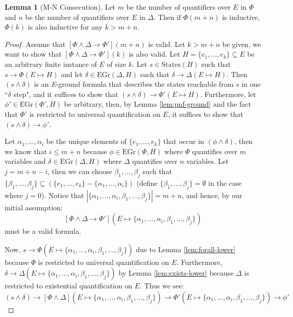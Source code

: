 \documentclass[12pt]{article}
\theoremstyle{definition}
\newtheorem{lemma}{Lemma}
\theoremstyle{remark}
\newcommand{\states}{\text{States}}
\newcommand{\gr}{\text{EGr}}
\begin{document}
\begin{lemma}[M-N Consecution]
  \label{ref:consecution}
  Let $m$ be the number of quantifiers over $E$ in $\Phi$ and $n$ be the number of quantifiers over $E$ in $\Delta$.  Then if $\Phi(m+n)$ is inductive, $\Phi(k)$ is also inductive for any $k>m+n$.
\end{lemma}
\begin{proof}
  Assume that $[\Phi\land\Delta \rightarrow \Phi'](m+n)$ is valid.  Let $k>m+n$ be given, we want to show that $[\Phi\land\Delta \rightarrow \Phi'](k)$ is also valid.  Let $H = \{e_1,...,e_k\} \subseteq E$ be an arbitrary finite instance of $E$ of size $k$.  Let $s \in \states(H)$ such that $s \rightarrow \Phi(E \mapsto H)$ and let $\delta \in \gr(\Delta,H)$ such that $\delta \rightarrow \Delta(E \mapsto H)$.  Then $(s \land \delta)$ is an \textit{E}-ground formula that describes the states reachable from $s$ in one ``$\delta$ step", and it suffices to show that $(s \land \delta) \rightarrow \Phi'(E \mapsto H)$.  Furthermore, let $\phi' \in \gr(\Phi',H)$ be arbitrary, then, by Lemma \ref{lem:pnf-ground} and the fact that $\Phi'$ is restricted to universal quantification on $E$, it suffices to show that $(s \land \delta) \rightarrow \phi'$.

  Let $\alpha_1,...,\alpha_i$ be the unique elements of $\{e_1,...,e_k\}$ that occur in $(\phi \land \delta)$, then we know that $i \leq m+n$ because $\phi \in \gr(\Phi,H)$ where $\Phi$ quantifies over $m$ variables and $\delta \in \gr(\Delta,H)$ where $\Delta$ quantifies over $n$ variables.  Let $j = m+n-i$, then we can choose $\beta_1,...,\beta_j$ such that $\{\beta_1,...,\beta_j\} \subseteq (\{e_1,...,e_k\}-\{\alpha_1,...,\alpha_i\})$ (define $\{\beta_1,...,\beta_j\}=\emptyset$ in the case where $j=0$).  Notice that $|\{\alpha_1,...,\alpha_i,\beta_1,...,\beta_j\}|=m+n$, and hence, by our initial assumption:
  $$[\Phi\land\Delta \rightarrow \Phi'](E \mapsto \{\alpha_1,...,\alpha_i,\beta_1,...,\beta_j\})$$
  must be a valid formula.

  Now, $s \rightarrow \Phi(E \mapsto \{\alpha_1,...,\alpha_i,\beta_1,...,\beta_j\})$ due to Lemma \ref{lem:forall-lower} because $\Phi$ is restricted to universal quantification on $E$.  Furthermore, $\delta \rightarrow \Delta(E \mapsto \{\alpha_1,...,\alpha_i,\beta_1,...,\beta_j\})$ by Lemma \ref{lem:exists-lower} because $\Delta$ is restricted to existential quantification on $E$.  Thus we see:
  $$(s \land \delta) \rightarrow [\Phi\land\Delta](E \mapsto \{\alpha_1,...,\alpha_i,\beta_1,...,\beta_j\}) \rightarrow \Phi'(E \mapsto \{\alpha_1,...,\alpha_i,\beta_1,...,\beta_j\}) \rightarrow \phi'$$
\end{proof}
\end{document}
